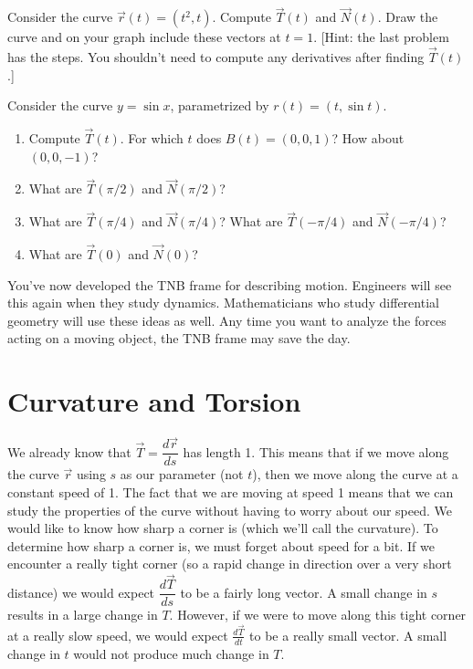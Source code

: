 \begin{problem}
Consider the curve $\vec r(t)=(t^2,t)$. Compute $\vec T(t)$ and $\vec N(t)$. Draw the curve and on your graph include these vectors at $t=1$. [Hint: the last problem has the steps.  You shouldn't need to compute any derivatives after finding $\vec T(t)$.]
\end{problem}



\begin{problem}
%
 Consider the curve $y=\sin x$, parametrized by $r(t)=(t,\sin t)$. 
\begin{enumerate}
 \item Compute $\vec T(t)$. For which $t$ does $B(t)=(0,0,1)$? How about $(0,0,-1)$?
 \item What are $\vec T(\pi/2)$ and $\vec N(\pi/2)$?
 \item What are $\vec T(\pi/4)$ and $\vec N(\pi/4)$? What are $\vec T(-\pi/4)$ and $\vec N(-\pi/4)$?
 \item What are $\vec T(0)$ and $\vec N(0)$?
\end{enumerate}
\end{problem}


You've now developed the TNB frame for describing motion. Engineers will see this again when they study dynamics. Mathematicians who study differential geometry will use these ideas as well. Any time you want to analyze the forces acting on a moving object, the TNB frame may save the day.

 
\section{Curvature and Torsion}

We already know that $\vec T=\dfrac{d\vec r}{ds}$ has length 1. This means that if we move along the curve $\vec r$ using $s$ as our parameter (not $t$), then we move along the curve at a constant speed of 1. The fact that we are moving at speed 1 means that we can study the properties of the curve without having to worry about our speed. We would like to know how sharp a corner is (which we'll call the curvature). To determine how sharp a corner is, we must forget about speed for a bit. If we encounter a really tight corner (so a rapid change in direction over a very short distance) we would expect $\dfrac{d\vec T}{ds}$ to be a fairly long vector. A small change in $s$ results in a large change in $T$. However, if we were to move along this tight corner at a really slow speed, we would expect $\frac{d\vec T}{dt}$ to be a really small vector. A small change in $t$ would not produce much change in $T$. 

